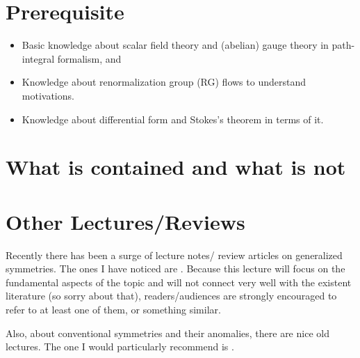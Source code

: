 \documentclass[
  letterpaper,
  DIV=11,
  numbers=noendperiod]{scrreport}
\providecommand{\tightlist}{%
  \setlength{\itemsep}{0pt}\setlength{\parskip}{0pt}}\usepackage{longtable,booktabs,array}
\begin{document}
\hypertarget{prerequisite}{%
\section*{Prerequisite}\label{prerequisite}}


\begin{itemize}
\tightlist
\item
  Basic knowledge about scalar field theory and (abelian) gauge theory
  in path-integral formalism, and
\item
  Knowledge about renormalization group (RG) flows to understand
  motivations.
\item
  Knowledge about differential form and Stokes's theorem in terms of it.
\end{itemize}

\hypertarget{what-is-contained-and-what-is-not}{%
\section*{What is contained and what is
not}\label{what-is-contained-and-what-is-not}}


\hypertarget{other-lecturesreviews}{%
\section*{Other Lectures/Reviews}\label{other-lecturesreviews}}


Recently there has been a surge of lecture notes/ review articles on
generalized symmetries. The ones I have noticed are
\autocite{McGreevy:2022oyu,Schafer-Nameki:2023jdn,Gomes:2023ahz,Bhardwaj:2023kri,Luo:2023ive,Shao:2023gho}.
Because this lecture will focus on the fundamental aspects of the topic
and will not connect very well with the existent literature (so sorry
about that), readers/audiences are strongly encouraged to refer to at
least one of them, or something similar.

Also, about conventional symmetries and their anomalies, there are nice
old lectures. The one I would particularly recommend is
\autocite{TachikawaTasi}.

\end{document}

